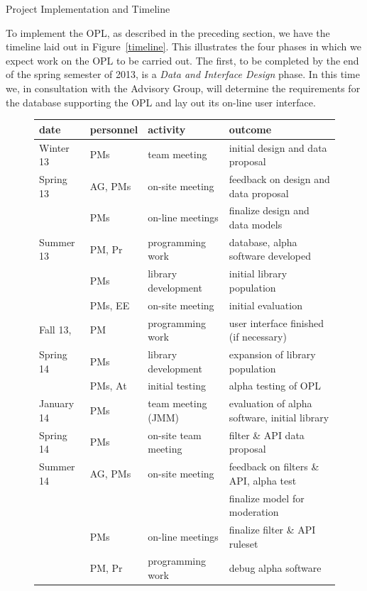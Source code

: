 \documentclass[11pt]{article}
\begin{document}
\begin{section}{Project Implementation and Timeline}

To implement the OPL, as described in the preceding section, we have the
timeline laid out in Figure~\ref{timeline}.  This illustrates the four
phases in which we expect work on the OPL to be carried out.  The first,
to be completed by the end of the spring semester of 2013, is a \emph{Data
and Interface Design} phase.  In this time we, in consultation with
the Advisory Group, will determine the requirements for the database
supporting the OPL and lay out its on-line user interface.

\begin{figure}
\begin{center}
\begin{tabular}{|l|l|l|l|}
  \hline
  \textbf{date} & \textbf{personnel} & \textbf{activity} & \textbf{outcome}\\
  \hline
  \hline
  Winter 13 & PMs & team meeting & initial design and data proposal\\
  \hline
  Spring 13 & AG, PMs & on-site meeting
	& feedback on design and data proposal\\
	& PMs & on-line meetings & finalize design and data models\\
  \hline
  Summer 13 & PM, Pr & programming work & database, alpha
	software developed \\ 
	& PMs & library development & initial library population \\
	& PMs, EE & on-site meeting & initial evaluation \\
  \hline
  Fall 13, & PM & programming work & user interface finished (if
	necessary) \\ 
  Spring 14 & PMs & library development & expansion of library population \\
	& PMs, At & initial testing & alpha testing of OPL \\
  \hline 
  January 14 & PMs & team meeting (JMM) & evaluation of alpha software,
	initial library \\
  \hline
  Spring 14 & PMs & on-site team meeting & filter \& API data proposal \\
  \hline
  Summer 14 & AG, PMs & on-site meeting &
 	feedback on filters \& API, alpha test \\
	& & & finalize model for moderation \\
	& PMs & on-line meetings & finalize filter \& API ruleset \\
	& PM, Pr & programming work & debug alpha software \\

\end{tabular}
\end{center}
\end{figure}
\end{section}
\end{document}
